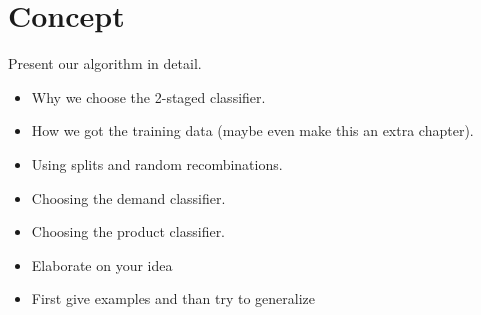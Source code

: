 \section{Concept}
\label{sec:concept}

Present our algorithm in detail.
\begin{itemize}
	\item Why we choose the 2-staged classifier.
	\item How we got the training data (maybe even make this an extra chapter).
	\item Using splits and random recombinations.
	\item Choosing the demand classifier.
	\item Choosing the product classifier.
\end{itemize}

\begin{itemize}
	\item Elaborate on your idea
	\item First give examples and than try to generalize
\end{itemize}
